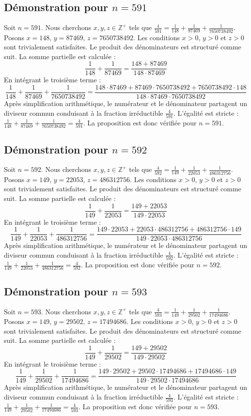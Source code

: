 \documentclass[11pt,a4paper]{article}
\begin{document}
\subsection{Démonstration pour $n = 591$}
Soit $n = 591$. Nous cherchons $x, y, z \in \mathbb{Z}^{+}$ tels que $\frac{4}{591} = \frac{1}{148} + \frac{1}{87469} + \frac{1}{7650738492}$.
Posons $x = 148$, $y = 87469$, $z = 7650738492$.
Les conditions $x > 0$, $y > 0$ et $z > 0$ sont trivialement satisfaites.
Le produit des dénominateurs est structuré comme suit. La somme partielle est calculée :
$$ \frac{1}{148} + \frac{1}{87469} = \frac{148+87469}{148 \cdot 87469} $$
En intégrant le troisième terme :
$$ \frac{1}{148} + \frac{1}{87469} + \frac{1}{7650738492} = \frac{148 \cdot 87469 + 87469 \cdot 7650738492 + 7650738492 \cdot 148}{148 \cdot 87469 \cdot 7650738492} $$
Après simplification arithmétique, le numérateur et le dénominateur partagent un diviseur commun conduisant à la fraction irréductible $\frac{4}{591}$.
L'égalité est stricte : $\frac{1}{148} + \frac{1}{87469} + \frac{1}{7650738492} = \frac{4}{591}$.
La proposition est donc vérifiée pour $n = 591$.
\subsection{Démonstration pour $n = 592$}
Soit $n = 592$. Nous cherchons $x, y, z \in \mathbb{Z}^{+}$ tels que $\frac{4}{592} = \frac{1}{149} + \frac{1}{22053} + \frac{1}{486312756}$.
Posons $x = 149$, $y = 22053$, $z = 486312756$.
Les conditions $x > 0$, $y > 0$ et $z > 0$ sont trivialement satisfaites.
Le produit des dénominateurs est structuré comme suit. La somme partielle est calculée :
$$ \frac{1}{149} + \frac{1}{22053} = \frac{149+22053}{149 \cdot 22053} $$
En intégrant le troisième terme :
$$ \frac{1}{149} + \frac{1}{22053} + \frac{1}{486312756} = \frac{149 \cdot 22053 + 22053 \cdot 486312756 + 486312756 \cdot 149}{149 \cdot 22053 \cdot 486312756} $$
Après simplification arithmétique, le numérateur et le dénominateur partagent un diviseur commun conduisant à la fraction irréductible $\frac{4}{592}$.
L'égalité est stricte : $\frac{1}{149} + \frac{1}{22053} + \frac{1}{486312756} = \frac{4}{592}$.
La proposition est donc vérifiée pour $n = 592$.
\subsection{Démonstration pour $n = 593$}
Soit $n = 593$. Nous cherchons $x, y, z \in \mathbb{Z}^{+}$ tels que $\frac{4}{593} = \frac{1}{149} + \frac{1}{29502} + \frac{1}{17494686}$.
Posons $x = 149$, $y = 29502$, $z = 17494686$.
Les conditions $x > 0$, $y > 0$ et $z > 0$ sont trivialement satisfaites.
Le produit des dénominateurs est structuré comme suit. La somme partielle est calculée :
$$ \frac{1}{149} + \frac{1}{29502} = \frac{149+29502}{149 \cdot 29502} $$
En intégrant le troisième terme :
$$ \frac{1}{149} + \frac{1}{29502} + \frac{1}{17494686} = \frac{149 \cdot 29502 + 29502 \cdot 17494686 + 17494686 \cdot 149}{149 \cdot 29502 \cdot 17494686} $$
Après simplification arithmétique, le numérateur et le dénominateur partagent un diviseur commun conduisant à la fraction irréductible $\frac{4}{593}$.
L'égalité est stricte : $\frac{1}{149} + \frac{1}{29502} + \frac{1}{17494686} = \frac{4}{593}$.
La proposition est donc vérifiée pour $n = 593$.
\end{document}
